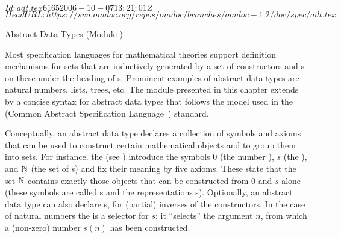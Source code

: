 \svnInfo $Id: adt.tex 6165 2006-10-07 13:21:01Z  $
\svnKeyword $HeadURL: https://svn.omdoc.org/repos/omdoc/branches/omdoc-1.2/doc/spec/adt.tex $

\begin{tchapter}[id=adt,short=Abstract Data Types]{Abstract Data Types (Module {})}

  Most specification languages for mathematical theories support definition mechanisms for
  sets that are inductively generated by a set of constructors and
  {s} on these under the heading of {s}. Prominent examples of abstract data types are natural numbers, lists,
  trees, etc. The module {} presented in this chapter extends {\omdoc} by
  a concise syntax for abstract data types that follows the model used in the {\casl}
  (Common Abstract Specification Language~\cite{CoFI:2004:CASL-RM}) standard.

  Conceptually, an abstract data type declares a collection of symbols and axioms that can
  be used to construct certain mathematical objects and to group them into sets. For
  instance, the {} (see {}) introduce the symbols
  $0$ (the number {}), $s$ (the {}), and ${\mathbb{N}}$
  (the set of {s}) and fix their meaning by five axioms. These
  state that the set ${\mathbb{N}}$ contains exactly those objects that can be constructed from $0$
  and $s$ alone (these symbols are called {s} and the
  representations {s}). Optionally, an abstract data type can
  also declare {s}, for (partial) inverses of the
  constructors. In the case of natural numbers the {} is a
  selector for $s$: it ``selects'' the argument $n$, from which a (non-zero) number $s(n)$
  has been constructed.


\end{tchapter}

